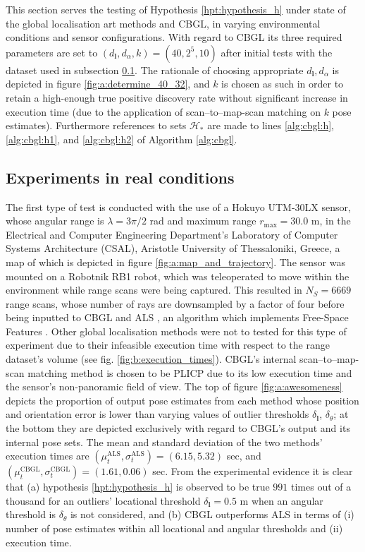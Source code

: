 This section serves the testing of Hypothesis \ref{hpt:hypothesis_h} under
state of the global localisation art methods and CBGL, in varying environmental
conditions and sensor configurations. With regard to CBGL its three required
parameters are set to $(d_{\bm{l}},d_{\alpha},k) = (40, 2^5, 10)$ after
initial tests with the dataset used in subsection \ref{subsec:exp_a}.
The rationale of choosing appropriate $d_{\bm{l}},d_{\alpha}$ is depicted in
figure \ref{fig:a:determine_40_32}, and $k$ is chosen as such in order to
retain a high-enough true positive discovery rate without significant increase
in execution time (due to the application of scan--to--map-scan matching on $k$
pose estimates). Furthermore references to sets $\mathcal{H}_{\ast}$ are made
to lines \ref{alg:cbgl:h}, \ref{alg:cbgl:h1}, and \ref{alg:cbgl:h2} of
Algorithm \ref{alg:cbgl}.


\subsection{Experiments in real conditions}
\label{subsec:exp_a}

The first type of test is conducted with the use of a Hokuyo UTM-30LX
sensor, whose angular range is $\lambda = 3\pi/2$ rad and maximum range
$r_{\max} = 30.0$ m, in the  Electrical and Computer Engineering Department's
Laboratory of Computer Systems Architecture (CSAL), Aristotle University of
Thessaloniki, Greece, a map of which is depicted in figure
\ref{fig:a:map_and_trajectory}. The sensor was mounted on a Robotnik RB1 robot,
which was teleoperated to move within the environment while range scans were
being captured. This resulted in $N_{S}=6669$ range scans, whose number of rays
are downsampled by a factor of four before being inputted to CBGL and ALS
\cite{als_jp}, an algorithm which implements Free-Space Features
\cite{als_eth}. Other global localisation methods were not to tested for this
type of experiment due to their infeasible execution time with respect to the
range dataset's volume (see fig. \ref{fig:b:execution_times}).  CBGL's internal
scan--to--map-scan matching method is chosen to be PLICP \cite{Censi2008c} due
to its low execution time and the sensor's non-panoramic field of view.  The top
of figure \ref{fig:a:awesomeness} depicts the proportion of output pose
estimates from each method whose position and orientation error is lower than
varying values of outlier thresholds $\delta_{\bm{l}}$, $\delta_{\theta}$; at
the bottom they are depicted exclusively with regard to CBGL's output and its
internal pose sets. The mean and standard deviation of the two methods'
execution times are $(\mu_t^{\text{ALS}}, \sigma_t^{\text{ALS}}) = (6.15,
5.32)$ sec, and $(\mu_t^{\text{CBGL}}, \sigma_t^{\text{CBGL}}) = (1.61, 0.06)$
sec. From the experimental evidence it is clear that (a) hypothesis
\ref{hpt:hypothesis_h} is observed to be true $991$ times out of a thousand for
an outliers' locational threshold $\delta_{\bm{l}} = 0.5$ m when an angular
threshold is $\delta_{\theta}$ is not considered, and (b) CBGL outperforms ALS
in terms of (i) number of pose estimates within all locational and angular
thresholds and (ii) execution time.

